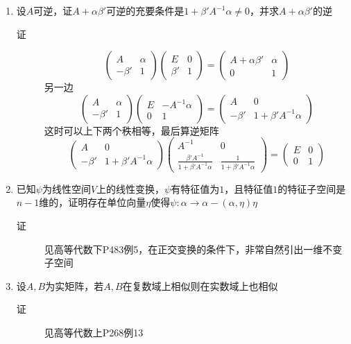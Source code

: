 \begin{enumerate}
\item 设$A$可逆，证$A+\alpha\beta'$可逆的充要条件是$1+\beta'A^{-1}\alpha \neq 0$，并求$A+\alpha\beta'$的逆
\begin{description}
\item[证]
\[
\left(
\begin{array}{cc}
A & \alpha \\
-\beta' & 1
\end{array}
\right)
\left(
\begin{array}{cc}
E & 0 \\
\beta' & 1
\end{array}
\right) = \left(
\begin{array}{cc}
A+\alpha\beta' & \alpha \\
0 & 1
\end{array}
\right)
\]
另一边
\[
\left(
\begin{array}{cc}
A & \alpha \\
-\beta' & 1
\end{array}
\right)
\left(
\begin{array}{cc}
E & -A^{-1}\alpha \\
0 & 1
\end{array}
\right) = \left(
\begin{array}{cc}
A & 0 \\
-\beta' & 1+\beta' A^{-1}\alpha
\end{array}
\right)
\]
这时可以上下两个秩相等，最后算逆矩阵
\[
\left(
\begin{array}{cc}
A & 0 \\
-\beta' & 1+\beta' A^{-1}\alpha
\end{array}
\right)
\left(
\begin{array}{cc}
A^{-1} & 0 \\
\frac{\beta'A^{-1}}{1+\beta' A^{-1}\alpha} & \frac{1}{1+\beta' A^{-1}\alpha}
\end{array}
\right) = \left(
\begin{array}{cc}
E & 0 \\
0 & 1
\end{array}
\right)
\]
\end{description}

\item 已知$\psi$为线性空间$V$上的线性变换，$\psi$有特征值为$1$，且特征值$1$的特征子空间是$n-1$维的，证明存在单位向量$\eta$使得$\psi:\alpha \rightarrow \alpha-(\alpha,\eta)\eta$
\begin{description}
\item[证] 见高等代数下P483例5，在正交变换的条件下，非常自然引出一维不变子空间
\end{description}


\item 设$A,B$为实矩阵，若$A,B$在复数域上相似则在实数域上也相似
\begin{description}
\item[证] 见高等代数上P268例13
\end{description}









\end{enumerate}